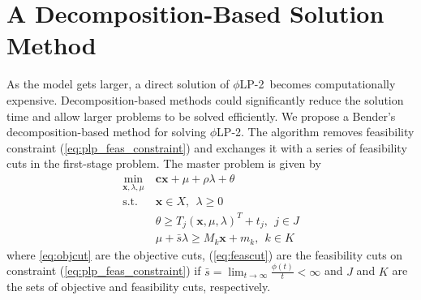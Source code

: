 \documentclass[opre,nonblindrev]{informs3} %
\newcommand{\x}{\mathbf{x}}
\renewcommand{\c}{\mathbf{c}}
\newcommand{\p}{\mathbf{p}}
\newcommand{\st}{\mbox{s.t.}}
\newcommand{\plp}{$\phi$LP-2}
\begin{document}


\section{A Decomposition-Based Solution Method}
\label{sec:soln_algorithm}

As the model gets larger, a direct solution of \plp\ becomes computationally expensive. 
Decomposition-based methods could significantly reduce the solution time and allow larger problems to be solved efficiently. We propose a Bender's decomposition-based method for solving \plp.
The algorithm removes feasibility constraint (\ref{eq:plp_feas_constraint})  and exchanges it with a series of feasibility cuts in the first-stage problem.
The master problem is given by
\begin{align}
	\min_{\x,\lambda,\mu} \ & \c\x + \mu + \rho \lambda + \theta \label{eq:master_problem}\\
	\st \ & \x \in X,\ \ \lambda \geq 0 \nonumber  \\
	& \theta \geq T_j (\x,\mu,\lambda)^T + t_j, \ \  j \in J  \label{eq:objcut} \\
	& \mu + \bar{s}\lambda \geq M_k \x + m_k, \ \ k \in K \label{eq:feascut} 
\end{align}
where \eqref{eq:objcut} are the objective cuts, (\ref{eq:feascut}) are the feasibility cuts on constraint (\ref{eq:plp_feas_constraint}) if $\bar{s} = \lim_{t \rightarrow \infty} \frac{\phi(t)}{t} < \infty$ and $J$ and $K$ are the sets of objective and feasibility cuts, respectively.
\end{document}
